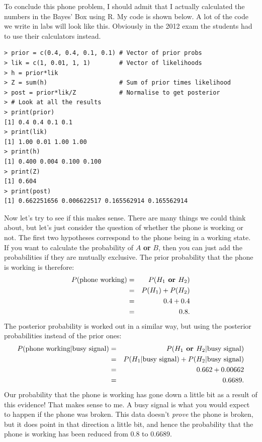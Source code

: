 To conclude this phone problem, I should admit that
I actually calculated the numbers in the Bayes' Box using R. My code is shown
below. A lot of the code we write in labs will look like this. Obviously in the
2012 exam the students had to use their calculators instead.
\begin{framed}
\begin{verbatim}
> prior = c(0.4, 0.4, 0.1, 0.1) # Vector of prior probs
> lik = c(1, 0.01, 1, 1)        # Vector of likelihoods
> h = prior*lik
> Z = sum(h)                    # Sum of prior times likelihood
> post = prior*lik/Z            # Normalise to get posterior
> # Look at all the results
> print(prior)
[1] 0.4 0.4 0.1 0.1
> print(lik)
[1] 1.00 0.01 1.00 1.00
> print(h)
[1] 0.400 0.004 0.100 0.100
> print(Z)
[1] 0.604
> print(post)
[1] 0.662251656 0.006622517 0.165562914 0.165562914
\end{verbatim}
\end{framed}
Now let's try to see if this makes sense. There are many things we could think
about, but let's just consider the question of whether
the phone is working or not. The first two hypotheses correspond to the phone
being in a working state. If you want to calculate the probability of $A$
{\bf or} $B$, then you can just add the probabilities if they are mutually
exclusive. The prior probability that the phone is working is
therefore:
\begin{eqnarray}
P(\textnormal{phone working}) &=& P(H_1 \textbf{ or } H_2)\\
&=& P(H_1) + P(H_2)\\
&=& 0.4 + 0.4\\
&=& 0.8.
\end{eqnarray}
The posterior probability is worked out in a similar way, but using the posterior
probabilities instead of the prior ones:
\begin{eqnarray}
P(\textnormal{phone working}|\textnormal{busy signal}) &=& P(H_1 \textbf{ or } H_2 | \textnormal{busy signal})\\
&=& P(H_1|\textnormal{busy signal}) + P(H_2|\textnormal{busy signal})\\
&=& 0.662 + 0.00662\\
&=& 0.6689.
\end{eqnarray}
Our probability that the phone is working has gone down a little bit as a result of this
evidence! That makes sense to me. A busy signal is what you would expect to
happen if the phone was broken. This data doesn't {\it prove} the phone is
broken, but it does point in that direction a little bit, and hence the
probability that the phone is working has been reduced from 0.8 to 0.6689.

